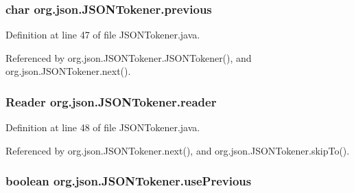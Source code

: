 \hypertarget{classorg_1_1json_1_1_j_s_o_n_tokener_a3bd1cd482f2a855d74b319e7d38366c5}{
\subsubsection[{previous}]{\setlength{\rightskip}{0pt plus 5cm}char org.\-json.\-J\-S\-O\-N\-Tokener.\-previous\hspace{0.3cm}{\ttfamily [private]}}}\label{classorg_1_1json_1_1_j_s_o_n_tokener_a3bd1cd482f2a855d74b319e7d38366c5}


Definition at line 47 of file J\-S\-O\-N\-Tokener.\-java.



Referenced by org.\-json.\-J\-S\-O\-N\-Tokener.\-J\-S\-O\-N\-Tokener(), and org.\-json.\-J\-S\-O\-N\-Tokener.\-next().

\hypertarget{classorg_1_1json_1_1_j_s_o_n_tokener_a41cf54327cbc4429da0e76ea032d9978}{
\subsubsection[{reader}]{\setlength{\rightskip}{0pt plus 5cm}Reader org.\-json.\-J\-S\-O\-N\-Tokener.\-reader\hspace{0.3cm}{\ttfamily [private]}}}\label{classorg_1_1json_1_1_j_s_o_n_tokener_a41cf54327cbc4429da0e76ea032d9978}


Definition at line 48 of file J\-S\-O\-N\-Tokener.\-java.



Referenced by org.\-json.\-J\-S\-O\-N\-Tokener.\-next(), and org.\-json.\-J\-S\-O\-N\-Tokener.\-skip\-To().

\hypertarget{classorg_1_1json_1_1_j_s_o_n_tokener_a15d3fdb7ac79686ded489fe1885bab49}{
\subsubsection[{use\-Previous}]{\setlength{\rightskip}{0pt plus 5cm}boolean org.\-json.\-J\-S\-O\-N\-Tokener.\-use\-Previous\hspace{0.3cm}{\ttfamily [private]}}}\label{classorg_1_1json_1_1_j_s_o_n_tokener_a15d3fdb7ac79686ded489fe1885bab49}


